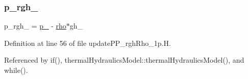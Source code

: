 \mbox{\label{updatePP__rghRho__1p_8H_a320090d1a3c1675778a59e981765c77c}} 
\subsubsection{\texorpdfstring{p\+\_\+rgh\+\_\+}{p\_rgh\_}}
{\footnotesize\ttfamily p\+\_\+rgh\+\_\+ = \hyperlink{updatePP__rghRho__2p_8H_a0ab83dbbf86dba470a7696e1609d523c}{p\+\_\+} -\/ \hyperlink{EEqn__1pl_8H_ac955f87ac2b79f02f420cae087fc52b1}{rho}$\ast$gh\+\_\+}



Definition at line 56 of file update\+P\+P\+\_\+rgh\+Rho\+\_\+1p.\+H.



Referenced by if(), thermal\+Hydraulics\+Model\+::thermal\+Hydraulics\+Model(), and while().

